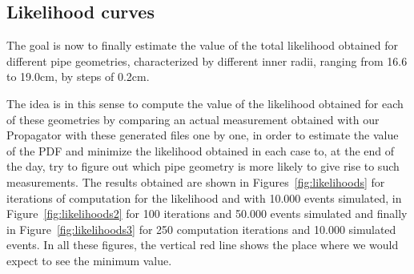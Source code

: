 \documentclass[a4paper, 11pt]{report}
\begin{document}
\subsection{Likelihood curves}

The goal is now to finally estimate the value of the total likelihood obtained for different pipe geometries, characterized by different inner radii, ranging from 16.6 to 19.0cm, by steps of 0.2cm.

The idea is in this sense to compute the value of the likelihood obtained for each of these geometries by comparing an actual measurement obtained with our Propagator with these generated files one by one, in order to estimate the value of the PDF and minimize the likelihood obtained in each case to, at the end of the day, try to figure out which pipe geometry is more likely to give rise to such measurements. The results obtained are shown in Figures~\ref{fig:likelihoods} for iterations of computation for the likelihood and with 10.000 events simulated, in Figure~\ref{fig:likelihoods2} for 100 iterations and 50.000 events simulated and finally in Figure~\ref{fig:likelihoods3} for 250 computation iterations and 10.000 simulated events. In all these figures, the vertical red line shows the place where we would expect to see the minimum value.
\end{document}
